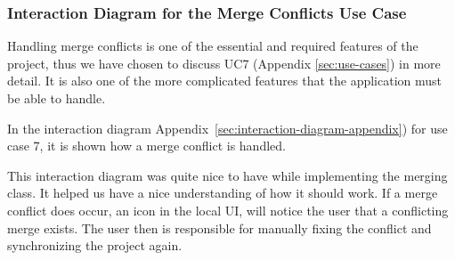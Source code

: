 \subsubsection{Interaction Diagram for the Merge Conflicts Use Case}

Handling merge conflicts is one of the essential and required features of the project, thus we have chosen to discuss UC7 (Appendix \ref{sec:use-cases})
in more detail. It is also one of the more complicated features that the application must be able to handle.

In the interaction diagram Appendix~\ref{sec:interaction-diagram-appendix}) for use case 7, it is shown how a merge conflict is handled. 

This interaction diagram was quite nice to have while implementing the merging class. It helped us have a nice understanding of how it should work. If
a merge conflict does occur, an icon in the local UI, will notice the user that a conflicting merge exists. The user then is responsible for manually 
fixing the conflict and synchronizing the project again.
